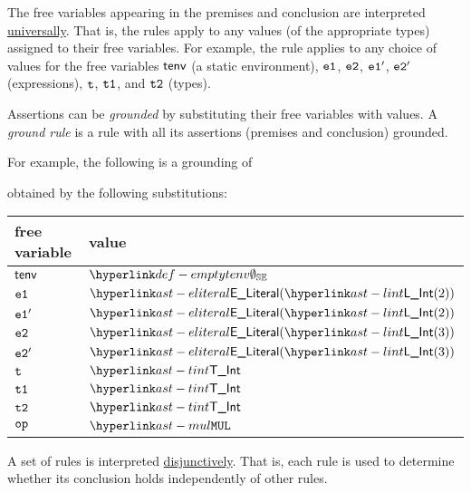 The free variables appearing in the premises and conclusion are interpreted \underline{universally}.
That is, the rules apply to any values (of the appropriate types) assigned to their free variables.
%
For example, the rule  applies to any choice of values for the free variables
$\tenv$ (a static environment),
$\veone$, $\vetwo$, $\veone'$, $\vetwo'$ (expressions),
$\vt$, $\vtone$, and $\vttwo$ (types).

\begin{definition}[Grounding]
Assertions can be \emph{grounded} by substituting their free variables with values.
A \emph{ground rule} is a rule with all its assertions (premises and conclusion) grounded.
\end{definition}
For example,
the following is a grounding of 
\begin{mathpar}
\end{mathpar}
obtained by the following substitutions:
\begin{tabular}{ll}
  \textbf{free variable} & \textbf{value}\\
  \hline
  $\tenv$   & $\emptytenv$\\
  $\veone$  & $\ELiteral(\lint(2))$\\
  $\veone'$  & $\ELiteral(\lint(2))$\\
  $\vetwo$  & $\ELiteral(\lint(3))$\\
  $\vetwo'$  & $\ELiteral(\lint(3))$\\
  $\vt$    & $\TInt$\\
  $\vtone$    & $\TInt$\\
  $\vttwo$    & $\TInt$\\
  $\op$       & $\MUL$
\end{tabular}

A set of rules is interpreted \underline{disjunctively}. That is, each rule is used to determine whether its conclusion
holds independently of other rules.

